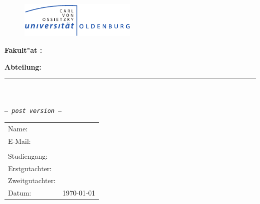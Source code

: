 \thispagestyle{empty}
\addtolength{\topmargin}{-\myTopMargin}
\enlargethispage{\myEnlargement}
\vspace*{-2cm}
\begin{figure}[htbp]
	\centering
	\includegraphics[width=0.5\textwidth]{./images/logoUniOL.pdf}
\end{figure}
\begin{center}
	\bf{Fakult"at \myFakultaet: \myFachbereich \newline \myInstitut}

	\bf{Abteilung: \myAbteilung}    
	\vspace*{0.5cm}

	{\color{grau}\noindent\rule{\textwidth-5cm}{1pt}}

	\vspace*{4.5cm}

	{\bf \huge \myTitle \\}
	\vspace*{1.5cm}
	{\Large \myDocumentType\\}
	\vspace*{0.5cm}
	{\large \it\texttt{-- post version --}}
\end{center}
\vfill
\normalsize{
	\begin{tabular}{ll}
	    	Name: & {\myName} \\
		E-Mail: & \myEmail \\ \\
	    	Studiengang: & \myStudiengang\\
		Erstgutachter: & \myFirstPruefer \\
		Zweitgutachter: & \mySecondPruefer \\
		Datum: & \today \\
	\end{tabular}
}
\addtolength{\topmargin}{\myTopMargin}

